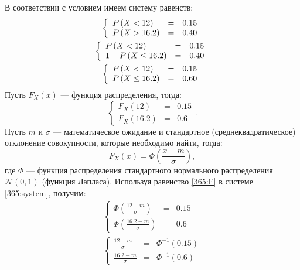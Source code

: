 В соответствии с условием имеем систему равенств:
\begin{gather}
    \left \{
    \begin{array}{lcl}
        \probability{X < 12}   & = & 0.15 \\
        \probability{X > 16.2} & = & 0.40
    \end{array}
    \right . \\
%
    \left \{
    \begin{array}{lcl}
        \probability{X < 12}         & = & 0.15 \\
        1 - \probability{X \le 16.2} & = & 0.40
    \end{array}
    \right . \\
%
    \left \{
    \begin{array}{lcl}
        \probability{X < 12}     & = & 0.15 \\
        \probability{X \le 16.2} & = & 0.60
    \end{array}
    \right .
\end{gather}
Пусть $F_X(x)$ --- функция распределения, тогда:
\begin{equation}
    \label{365:system}
    \left \{
    \begin{array}{lcl}
        F_X(12)   & = & 0.15 \\
        F_X(16.2) & = & 0.6
    \end{array}
    \right .
    .
\end{equation}
Пусть $m$ и $\sigma$ --- математическое ожидание и стандартное (среднеквадратическое) отклонение совокупности, которые необходимо найти, тогда:
\begin{equation}
    \label{365:F}
    F_X(x) = \Phi \left ( \frac{x - m}{\sigma} \right ),
\end{equation}
где $\Phi$ --- функция распределения стандартного нормального распределения $\mathcal{N}(0, 1)$ (функция Лапласа). Используя равенство \eqref{365:F} в системе \eqref{365:system}, получим:
\begin{gather}
    \left \{
    \begin{array}{lcl}
        \Phi \left ( \frac{12-m}{\sigma} \right )   & = & 0.15 \\
        \Phi \left ( \frac{16.2-m}{\sigma} \right ) & = & 0.6
    \end{array}
    \right . \\
    \left \{
    \begin{array}{lcl}
        \frac{12-m}{\sigma}   & = & \Phi^{-1} \left (  0.15 \right ) \\
        \frac{16.2-m}{\sigma} & = & \Phi^{-1} \left ( 0.6 \right )
    \end{array}
    \right .
\end{gather}
